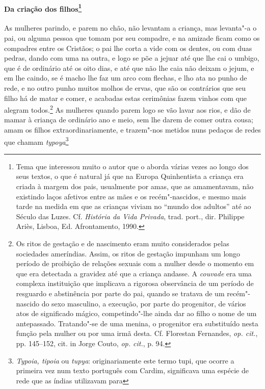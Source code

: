 \begin{linenumbers}
\paragraph[Da criação dos filhos]{Da criação dos filhos\protect\footnote{ Tema que interessou muito o
autor que o aborda várias vezes ao longo dos seus textos, o que é
natural já que na Europa Quinhentista a criança era criada à margem dos
pais, usualmente por amas, que as amamentavam, não existindo laços
afetivos entre as mães e os recém"-nascidos, e mesmo mais tarde na
medida em que as crianças viviam no ``mundo dos adultos'' até ao Século
das Luzes. Cf. \textit{História da Vida Privada}, trad. port., dir.
Philippe Ariès, Lisboa, Ed. Afrontamento, 1990.}} \quad
 As mulheres parindo, e parem no chão, não levantam a criança, mas
levanta"-a o pai, ou alguma pessoa que tomam por seu compadre, e na
amizade ficam como os compadres entre os Cristãos; o pai lhe corta a
vide com os dentes, ou com duas pedras, dando com uma na outra, e logo
se põe a jejuar até que lhe cai o umbigo, que é de ordinário até os
oito dias, e até que não lhe caia não deixam o jejum, e em lhe caindo,
se é macho lhe faz um arco com flechas, e lho ata no punho de rede, e
no outro punho muitos molhos de ervas, que são os contrários que seu
filho há de matar e comer, e acabadas estas cerimônias fazem vinhos com
que alegram todos.\footnote{ Os ritos de gestação e de nascimento eram
muito considerados pelas sociedades ameríndias. Assim, os ritos de
gestação impunham um longo período de proibição de relações sexuais com
a mulher desde o momento em que era detectada a gravidez até que a
criança andasse. A \textit{couvade} era uma complexa instituição que
implicava a rigorosa observância de um período de resguardo e
abstinência por parte do pai, quando se tratava de um recém"-nascido do
sexo masculino, a execução, por parte do progenitor, de vários atos de
significado mágico, competindo"-lhe ainda dar ao filho o nome de um
antepassado. Tratando"-se de uma menina, o progenitor era substituído
nesta função pela mulher ou por uma irmã desta. Cf. Florestan
Fernandes, \textit{op. cit.}, pp. 145--152, cit. in Jorge Couto, 
\textit{op. cit.}, p. 94.} As mulheres quando parem logo se vão lavar
aos rios, e dão de mamar à criança de ordinário ano e meio, sem lhe
darem de comer outra cousa; amam os filhos extraordinariamente, e
trazem"-nos metidos nuns pedaços de redes que chamam 
\textit{typoya}\footnote{ \textit{Typoia, tipoia} ou \textit{tupya}: originariamente
este termo tupi, que ocorre a primeira vez num texto português com
Cardim, significava uma espécie de rede que as índias utilizavam para
}
\end{linenumbers}
